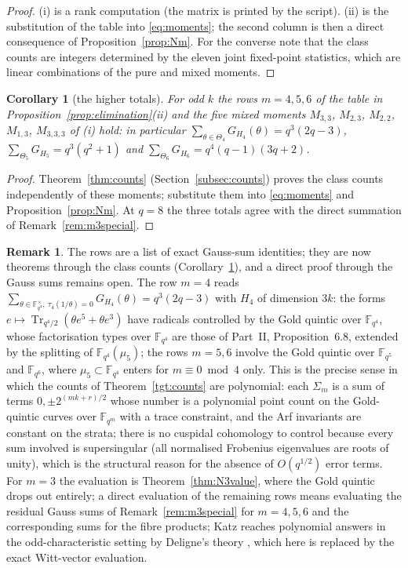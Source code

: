 \documentclass[12pt,a4paper]{amsart}
\newtheorem{corollary}[theorem]{Corollary}
\theoremstyle{definition}
\newtheorem{remark}[theorem]{Remark}
\newcommand{\F}{\mathbb{F}}
\newcommand{\Tr}{\operatorname{Tr}}
\begin{document}
\begin{proof}
(i) is a rank computation (the matrix is printed by the script). (ii) is the substitution of the table into \eqref{eq:moments}; the second column is then a direct consequence of Proposition~\ref{prop:Nm}. For the converse note that the class counts are integers determined by the eleven joint fixed-point statistics, which are linear combinations of the pure and mixed moments.
\end{proof}

\begin{corollary}[the higher totals]\label{cor:totals}
For odd $k$ the rows $m=4,5,6$ of the table in Proposition~\ref{prop:elimination}\textup{(ii)} and the five mixed moments $M_{3,3}$, $M_{2,3}$, $M_{2,2}$, $M_{1,3}$, $M_{3,3,3}$ of \textup{(i)} hold: in particular $\sum_{\theta\in\Theta_4}G_{H_4}(\theta)=q^3(2q-3)$, $\sum_{\Theta_5}G_{H_5}=q^3(q^2+1)$ and $\sum_{\Theta_6}G_{H_6}=q^4(q-1)(3q+2)$.
\end{corollary}
\begin{proof}
Theorem~\ref{thm:counts} (Section~\ref{subsec:counts}) proves the class counts independently of these moments; substitute them into \eqref{eq:moments} and Proposition~\ref{prop:Nm}. At $q=8$ the three totals agree with the direct summation of Remark~\ref{rem:m3special}.
\end{proof}

\begin{remark}
The rows are a list of exact Gauss-sum identities; they are now theorems through the class counts (Corollary~\ref{cor:totals}), and a direct proof through the Gauss sums remains open. The row $m=4$ reads $\sum_{\theta\in\F_{q^4}^\times,\ \tau_4(1/\theta)=0}G_{H_4}(\theta)=q^3(2q-3)$ with $H_4$ of dimension $3k$: the forms $e\mapsto\Tr_{q^4/2}(\theta e^5+\theta e^3)$ have radicals controlled by the Gold quintic over $\F_{q^4}$, whose factorisation types over $\F_{q^4}$ are those of Part~II, Proposition~6.8, extended by the splitting of $\F_{q^4}(\mu_5)$; the rows $m=5,6$ involve the Gold quintic over $\F_{q^5}$ and $\F_{q^6}$, where $\mu_5\subset\F_{q^4}$ enters for $m\equiv0\bmod4$ only. This is the precise sense in which the counts of Theorem~\ref{tgt:counts} are polynomial: each $\Sigma_m$ is a sum of terms $0,\pm2^{(mk+r)/2}$ whose number is a polynomial point count on the Gold-quintic curves over $\F_{q^m}$ with a trace constraint, and the Arf invariants are constant on the strata; there is no cuspidal cohomology to control because every sum involved is supersingular (all normalised Frobenius eigenvalues are roots of unity), which is the structural reason for the absence of $O(q^{1/2})$ error terms. For $m=3$ the evaluation is Theorem~\ref{thm:N3value}, where the Gold quintic drops out entirely; a direct evaluation of the remaining rows means evaluating the residual Gauss sums of Remark~\ref{rem:m3special} for $m=4,5,6$ and the corresponding sums for the fibre products; Katz \cite{KatzKR} reaches polynomial answers in the odd-characteristic setting by Deligne's theory \cite{Deligne}, which here is replaced by the exact Witt-vector evaluation.
\end{remark}
\end{document}
